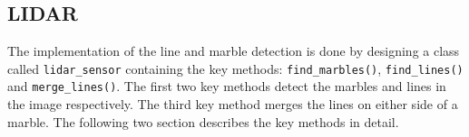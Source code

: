 \documentclass[../Head/Main.tex]{subfiles}
\begin{document}
\subsection{LIDAR}
The implementation of the line and marble detection is done by designing a class called \texttt{lidar\_sensor} containing the key methods: \texttt{find\_marbles()}, \texttt{find\_lines()} and \texttt{merge\_lines()}. The first two key methods detect the marbles and lines in the image respectively. The third key method merges the lines on either side of a marble. The following two section describes the key methods in detail.


\end{document}
